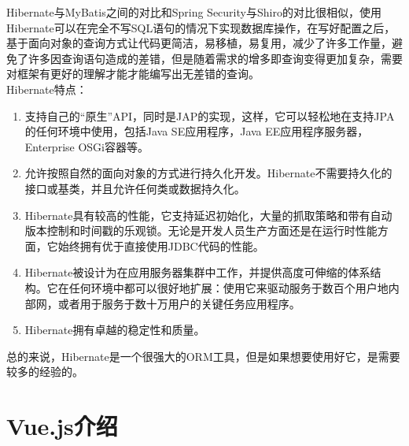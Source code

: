 \begin{enumerate}
\begin{figure}[H]
        \end{figure} Hibernate与MyBatis之间的对比和Spring Security与Shiro的对比很相似，使用Hibernate可以在完全不写SQL语句的情况下实现数据库操作，在写好配置之后，基于面向对象的查询方式让代码更简洁，易移植，易复用，减少了许多工作量，避免了许多因查询语句造成的差错，但是随着需求的增多即查询变得更加复杂，需要对框架有更好的理解才能才能编写出无差错的查询。\\
        Hibernate特点：
        \begin{enumerate}
          \item 支持自己的“原生”API，同时是JAP的实现，这样，它可以轻松地在支持JPA的任何环境中使用，包括Java SE应用程序，Java EE应用程序服务器，Enterprise OSGi容器等。
          \item 允许按照自然的面向对象的方式进行持久化开发。Hibernate不需要持久化的接口或基类，并且允许任何类或数据持久化。
          \item Hibernate具有较高的性能，它支持延迟初始化，大量的抓取策略和带有自动版本控制和时间戳的乐观锁。无论是开发人员生产方面还是在运行时性能方面，它始终拥有优于直接使用JDBC代码的性能。
          \item Hibernate被设计为在应用服务器集群中工作，并提供高度可伸缩的体系结构。它在任何环境中都可以很好地扩展：使用它来驱动服务于数百个用户地内部网，或者用于服务于数十万用户的关键任务应用程序。
          \item Hibernate拥有卓越的稳定性和质量。
        \end{enumerate}
        总的来说，Hibernate是一个很强大的ORM工具，但是如果想要使用好它，是需要较多的经验的。
\end{enumerate}

\section{Vue.js介绍}

